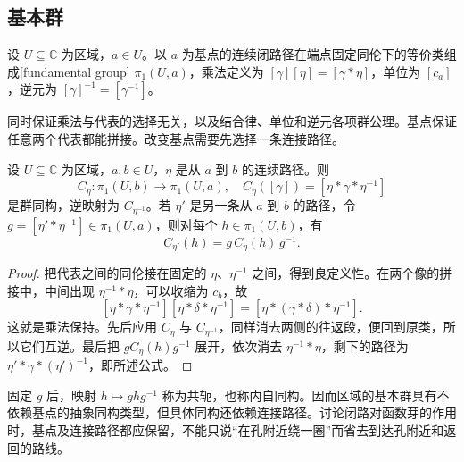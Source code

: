 \subsection{基本群}
\label{b3:subsec:090103}

\begin{definition}\label{b3:def:09-fundamental-group}
设 \(U\subseteq\mathbb C\) 为区域，\(a\in U\)。以 \(a\) 为基点的连续闭路径在端点固定同伦下的等价类组成[fundamental group] \(\pi_1(U,a)\)，乘法定义为 \([\gamma][\eta]=[\gamma*\eta]\)，单位为 \([c_a]\)，逆元为 \([\gamma]^{-1}=[\gamma^{-1}]\)。
\end{definition}
同时保证乘法与代表的选择无关，以及结合律、单位和逆元各项群公理。基点保证任意两个代表都能拼接。改变基点需要先选择一条连接路径。

\begin{proposition}\label{b3:prop:09-basepoint-change}
设 \(U\subseteq\mathbb C\) 为区域，\(a,b\in U\)，\(\eta\) 是从 \(a\) 到 \(b\) 的连续路径。则
\[
 C_\eta:\pi_1(U,b)\longrightarrow\pi_1(U,a),
 \quad C_\eta([\gamma])=[\eta*\gamma*\eta^{-1}]
\]
是群同构，逆映射为 \(C_{\eta^{-1}}\)。若 \(\eta'\) 是另一条从 \(a\) 到 \(b\) 的路径，令 \(g=[\eta'*\eta^{-1}]\in\pi_1(U,a)\)，则对每个 \(h\in\pi_1(U,b)\)，有
\[
 C_{\eta'}(h)=g\,C_\eta(h)\,g^{-1}.
\]
\end{proposition}
\begin{proof}
把代表之间的同伦接在固定的 \(\eta\)、\(\eta^{-1}\) 之间，得到良定义性。在两个像的拼接中，中间出现 \(\eta^{-1}*\eta\)，可以收缩为 \(c_b\)，故
\[
 [\eta*\gamma*\eta^{-1}][\eta*\delta*\eta^{-1}]
 =[\eta*(\gamma*\delta)*\eta^{-1}].
\]
这就是乘法保持。先后应用 \(C_\eta\) 与 \(C_{\eta^{-1}}\)，同样消去两侧的往返段，便回到原类，所以它们互逆。最后把 \(gC_\eta(h)g^{-1}\) 展开，依次消去 \(\eta^{-1}*\eta\)，剩下的路径为 \(\eta'*\gamma*(\eta')^{-1}\)，即所述公式。
\end{proof}
固定 \(g\) 后，映射 \(h\mapsto ghg^{-1}\) 称为共轭，也称内自同构。因而区域的基本群具有不依赖基点的抽象同构类型，但具体同构还依赖连接路径。讨论闭路对函数芽的作用时，基点及连接路径都应保留，不能只说“在孔附近绕一圈”而省去到达孔附近和返回的路线。

